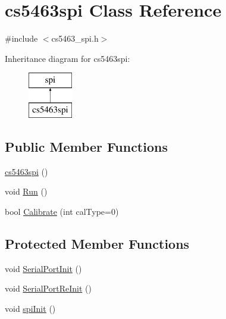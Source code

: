 \hypertarget{classcs5463spi}{\section{cs5463spi Class Reference}
\label{classcs5463spi}
}


{\ttfamily \#include $<$cs5463\-\_\-spi.\-h$>$}

Inheritance diagram for cs5463spi\-:\begin{figure}[H]
\begin{center}
\leavevmode
\includegraphics[height=2.000000cm]{classcs5463spi}
\end{center}
\end{figure}
\subsection*{Public Member Functions}
\begin{DoxyCompactItemize}
\item 
\hyperlink{classcs5463spi_a8b67189087e7c275a4da52992bc20324}{cs5463spi} ()
\item 
void \hyperlink{classcs5463spi_a2f1ec8b010596b4af7f64c486cdaf179}{Run} ()
\item 
bool \hyperlink{classcs5463spi_ad7baacfc87b389db65a26bd9886c6cc2}{Calibrate} (int cal\-Type=0)
\end{DoxyCompactItemize}
\subsection*{Protected Member Functions}
\begin{DoxyCompactItemize}
\item 
void \hyperlink{classcs5463spi_a8f0e36eb00a90919ae9a193b8afe69cb}{Serial\-Port\-Init} ()
\item 
void \hyperlink{classcs5463spi_afd9b989c60c3d8d24843862702dfcdea}{Serial\-Port\-Re\-Init} ()
\item 
void \hyperlink{classcs5463spi_ab61f5c633635597575dd756dd26391f3}{spi\-Init} ()
\end{DoxyCompactItemize}

